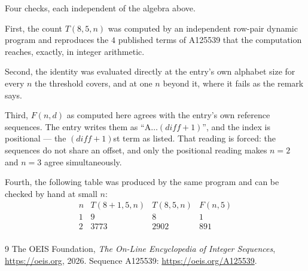\documentclass[11pt,a4paper]{article}
\theoremstyle{plain}
\theoremstyle{definition}
\begin{document}
Four checks, each independent of the algebra above.

First, the count $T(8,5,n)$ was computed by an independent row-pair dynamic program and
reproduces the $4$ published terms of A125539 that the computation reaches,
exactly, in integer arithmetic.

Second, the identity was evaluated directly at the entry's own alphabet size for every $n$ the
threshold covers, and at one $n$ beyond it, where it fails as the remark says.

Third, $F(n,d)$ as computed here agrees with the entry's own reference sequences. The entry
writes them as ``$\mathrm{A}\dots(\mathit{diff}+1)$'', and the index is positional --- the
$(\mathit{diff}+1)$st term as listed. That reading is forced: the sequences do not share an
offset, and only the positional reading makes $n=2$ and $n=3$ agree simultaneously.

Fourth, the following table was produced by the same program and can be checked by hand at
small $n$:
\[
\begin{array}{rrrr}
n & T(8+1,5,n) & T(8,5,n) & F(n,5) \\ \hline
1 & 9 & 8 & 1 \\
2 & 3773 & 2902 & 891 \\
\end{array}
\]

\begin{thebibliography}{9}
 The OEIS Foundation, \emph{The On-Line Encyclopedia of Integer Sequences},
\url{https://oeis.org}, 2026. Sequence A125539: \url{https://oeis.org/A125539}.
\end{thebibliography}
\end{document}
